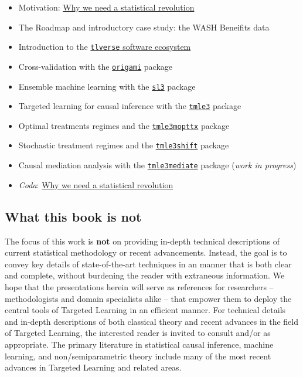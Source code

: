 \documentclass[12pt, krantz2,]{krantz}
\providecommand{\tightlist}{%
  \setlength{\itemsep}{0pt}\setlength{\parskip}{0pt}}
\theoremstyle{definition}
\theoremstyle{definition}
\theoremstyle{definition}
\newcommand{\1}{\mathbbm{1}}
\begin{document}
\begin{itemize}
\tightlist
\item
  Motivation: \href{https://senseaboutscienceusa.org/super-learning-and-the-revolution-in-knowledge/}{Why we need a statistical
  revolution}
\item
  The Roadmap and introductory case study: the WASH Beneifits data
\item
  Introduction to the \href{https://tlverse.org}{\texttt{tlverse} software
  ecosystem}
\item
  Cross-validation with the \href{https://github.com/tlverse/origami}{\texttt{origami}}
  package
\item
  Ensemble machine learning with the
  \href{https://github.com/tlverse/sl3}{\texttt{sl3}} package
\item
  Targeted learning for causal inference with the
  \href{https://github.com/tlverse/tmle3}{\texttt{tmle3}} package
\item
  Optimal treatments regimes and the
  \href{https://github.com/tlverse/tmle3mopttx}{\texttt{tmle3mopttx}} package
\item
  Stochastic treatment regimes and the
  \href{https://github.com/tlverse/tmle3shift}{\texttt{tmle3shift}} package
\item
  Causal mediation analysis with the
  \href{https://github.com/tlverse/tmle3mediate}{\texttt{tmle3mediate}} package
  (\emph{work in progress})
\item
  \emph{Coda}: \href{https://senseaboutscienceusa.org/super-learning-and-the-revolution-in-knowledge/}{Why we need a statistical
  revolution}
\end{itemize}

\hypertarget{what-this-book-is-not}{%
\subsection*{What this book is not}\label{what-this-book-is-not}}


The focus of this work is \textbf{not} on providing in-depth technical descriptions
of current statistical methodology or recent advancements. Instead, the goal is
to convey key details of state-of-the-art techniques in an manner that is both
clear and complete, without burdening the reader with extraneous information.
We hope that the presentations herein will serve as references for researchers
-- methodologists and domain specialists alike -- that empower them to deploy
the central tools of Targeted Learning in an efficient manner. For technical
details and in-depth descriptions of both classical theory and recent advances
in the field of Targeted Learning, the interested reader is invited to consult
\citet{vdl2011targeted} and/or \citet{vdl2018targeted} as appropriate. The primary literature
in statistical causal inference, machine learning, and non/semiparametric theory
include many of the most recent advances in Targeted Learning and related areas.
\end{document}
